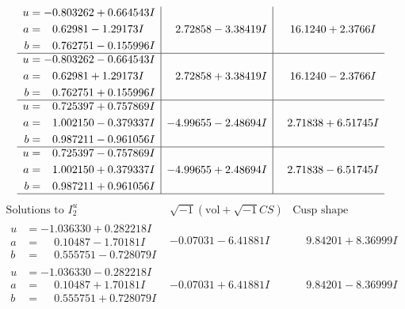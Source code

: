 \documentclass[1p]{elsarticle_modified}
\theoremstyle{definition}
\newcommand{\I}{\sqrt{-1}}
\begin{document}
$$\begin{array}{c|c|c}
\begin{aligned}
u &= -0.803262 + 0.664543 I \\
a &= \phantom{-}0.62981 - 1.29173 I \\
b &= \phantom{-}0.762751 - 0.155996 I\end{aligned}
 & \phantom{-}2.72858 - 3.38419 I & \phantom{-}16.1240 + 2.3766 I \\ \hline\begin{aligned}
u &= -0.803262 - 0.664543 I \\
a &= \phantom{-}0.62981 + 1.29173 I \\
b &= \phantom{-}0.762751 + 0.155996 I\end{aligned}
 & \phantom{-}2.72858 + 3.38419 I & \phantom{-}16.1240 - 2.3766 I \\ \hline\begin{aligned}
u &= \phantom{-}0.725397 + 0.757869 I \\
a &= \phantom{-}1.002150 - 0.379337 I \\
b &= \phantom{-}0.987211 - 0.961056 I\end{aligned}
 & -4.99655 - 2.48694 I & \phantom{-}2.71838 + 6.51745 I \\ \hline\begin{aligned}
u &= \phantom{-}0.725397 - 0.757869 I \\
a &= \phantom{-}1.002150 + 0.379337 I \\
b &= \phantom{-}0.987211 + 0.961056 I\end{aligned}
 & -4.99655 + 2.48694 I & \phantom{-}2.71838 - 6.51745 I\\
 \hline 
 \end{array}$$\newpage$$\begin{array}{c|c|c}  
\text{Solutions to }I^u_{2}& \I (\text{vol} + \sqrt{-1}CS) & \text{Cusp shape}\\
 \hline 
\begin{aligned}
u &= -1.036330 + 0.282218 I \\
a &= \phantom{-}0.10487 - 1.70181 I \\
b &= \phantom{-}0.555751 - 0.728079 I\end{aligned}
 & -0.07031 - 6.41881 I & \phantom{-}9.84201 + 8.36999 I \\ \hline\begin{aligned}
u &= -1.036330 - 0.282218 I \\
a &= \phantom{-}0.10487 + 1.70181 I \\
b &= \phantom{-}0.555751 + 0.728079 I\end{aligned}
 & -0.07031 + 6.41881 I & \phantom{-}9.84201 - 8.36999 I \\ \hline\begin{aligned}

\end{aligned}
\end{array}$$
\end{document}
